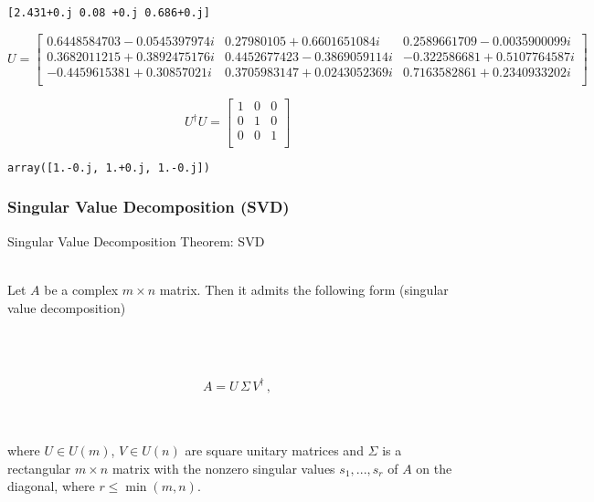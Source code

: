 \documentclass[11pt]{article}
\makeatletter
\newcommand{\boxspacing}{\kern\kvtcb@left@rule\kern\kvtcb@boxsep}
\newcommand{\prompt}[4]{
        {\ttfamily\llap{{\color{#2}[#3]:\hspace{3pt}#4}}\vspace{-\baselineskip}}
    }
\makeatother
\begin{document}
    \begin{Verbatim}[commandchars=\\\{\}]
[2.431+0.j 0.08 +0.j 0.686+0.j]
    \end{Verbatim}

    $$
U = 
\begin{bmatrix}
0.6448584703 - 0.0545397974 i & 0.27980105 + 0.6601651084 i & 0.2589661709 - 0.0035900099 i  \\
 0.3682011215 + 0.3892475176 i & 0.4452677423 - 0.3869059114 i & -0.322586681 + 0.5107764587 i  \\
 -0.4459615381 + 0.30857021 i & 0.3705983147 + 0.0243052369 i & 0.7163582861 + 0.2340933202 i  \\
 \end{bmatrix}
$$

    
    $$
U^{\dagger}U = 
\begin{bmatrix}
1 & 0 & 0  \\
 0 & 1 & 0  \\
 0 & 0 & 1  \\
 \end{bmatrix}
$$

    
            \begin{tcolorbox}[breakable, size=fbox, boxrule=.5pt, pad at break*=1mm, opacityfill=0]
\prompt{Out}{outcolor}{19}{\boxspacing}
\begin{Verbatim}[commandchars=\\\{\}]
array([1.-0.j, 1.+0.j, 1.-0.j])
\end{Verbatim}
\end{tcolorbox}
        
    \subsubsection{Singular Value Decomposition
(SVD)}\label{singular-value-decomposition-svd}

    Singular Value Decomposition Theorem: SVD\\
\strut \\
Let \(A\) be a complex \(m\times n\) matrix. Then it admits the
following form (singular value decomposition)\\
\strut \\
\strut \\
\[
A = U \,\Sigma\, V^{\dagger} \,,
\]\\
\strut \\
where \(U \in U(m)\), \(V \in U(n)\) are square unitary matrices and
\(\Sigma\) is a rectangular \(m \times n\) matrix with the nonzero
singular values \(s_1, ..., s_r\) of \(A\) on the diagonal, where
\(r \leq \min(m,n)\).
\end{document}
